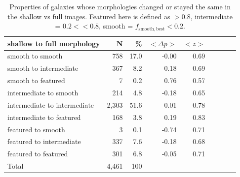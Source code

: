\documentclass[twocolumn]{aastex6}
\begin{document}
\begin{table}
\caption{Properties of galaxies whose morphologies changed or stayed the same in the shallow vs full images. Featured here is defined as \fbest$>0.8$, intermediate = $0.2<$\fbest$<0.8$, smooth = $f_\mathrm{smooth,best}<0.2$. \label{tbl:shallow_to_full_stats}}
\begin{tabular}{lrrrrrrrr}
\hline\hline
shallow to full morphology    & N       & \%       & $<\Delta p>$ & $<z>$ \\
\hline
smooth to smooth              & 758     & 17.0     & -0.00        &  0.69\\
smooth to intermediate        & 367     & 8.2      & 0.18         &  0.69\\
smooth to featured            & 7       & 0.2      & 0.76         &  0.57\\ 
intermediate to smooth        & 214     & 4.8      & -0.18        &  0.65\\
intermediate to intermediate  & 2,303   & 51.6     & 0.01         &  0.78 \\
intermediate to featured      & 168     & 3.8      & 0.19         &  0.83\\
featured to smooth            & 3       & 0.1      & -0.74        &  0.71\\
featured to intermediate      & 337     & 7.6      & -0.18        &  0.68\\
featured to featured          & 301     & 6.8      & -0.05        &  0.71\\

Total                         & 4,461   & 100      &              & \\
\hline\hline
\end{tabular}
\end{table}
\end{document}
